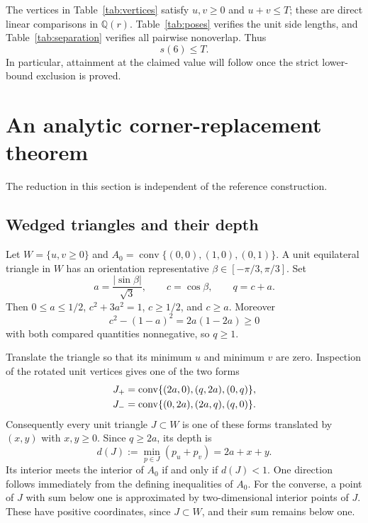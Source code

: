 \documentclass[11pt]{article}
\begin{document}
The vertices in Table~\ref{tab:vertices} satisfy $u,v\ge0$ and $u+v\le T$; these are direct linear comparisons in $\mathbb Q(r)$. Table~\ref{tab:poses} verifies the unit side lengths, and Table~\ref{tab:separation} verifies all pairwise nonoverlap. Thus
\begin{equation}\label{eq:upper}
 s(6)\le T.
\end{equation}
In particular, attainment at the claimed value will follow once the strict lower-bound exclusion is proved.

\section{An analytic corner-replacement theorem}\label{sec:corner}

The reduction in this section is independent of the reference construction.

\subsection{Wedged triangles and their depth}

Let $W=\{u,v\ge0\}$ and $A_0=\operatorname{conv}\{(0,0),(1,0),(0,1)\}$. A unit equilateral triangle in $W$ has an orientation representative $\beta\in[-\pi/3,\pi/3]$. Set
\[
 a=\frac{|\sin\beta|}{\sqrt3},\qquad c=\cos\beta,\qquad q=c+a.
\]
Then $0\le a\le1/2$, $c^2+3a^2=1$, $c\ge1/2$, and $c\ge a$. Moreover
\[
 c^2-(1-a)^2=2a(1-2a)\ge0
\]
with both compared quantities nonnegative, so $q\ge1$.

Translate the triangle so that its minimum $u$ and minimum $v$ are zero. Inspection of the rotated unit vertices gives one of the two forms
\begin{align}\label{eq:wedged}
 J_+&=\operatorname{conv}\{(2a,0),(q,2a),(0,q)\},\\
 J_-&=\operatorname{conv}\{(0,2a),(2a,q),(q,0)\}.\notag
\end{align}
Consequently every unit triangle $J\subset W$ is one of these forms translated by $(x,y)$ with $x,y\ge0$. Since $q\ge2a$, its depth is
\begin{equation}\label{eq:depth}
 d(J):=\min_{p\in J}(p_u+p_v)=2a+x+y.
\end{equation}
Its interior meets the interior of $A_0$ if and only if $d(J)<1$. One direction follows immediately from the defining inequalities of $A_0$. For the converse, a point of $J$ with sum below one is approximated by two-dimensional interior points of $J$. These have positive coordinates, since $J\subset W$, and their sum remains below one.
\end{document}
